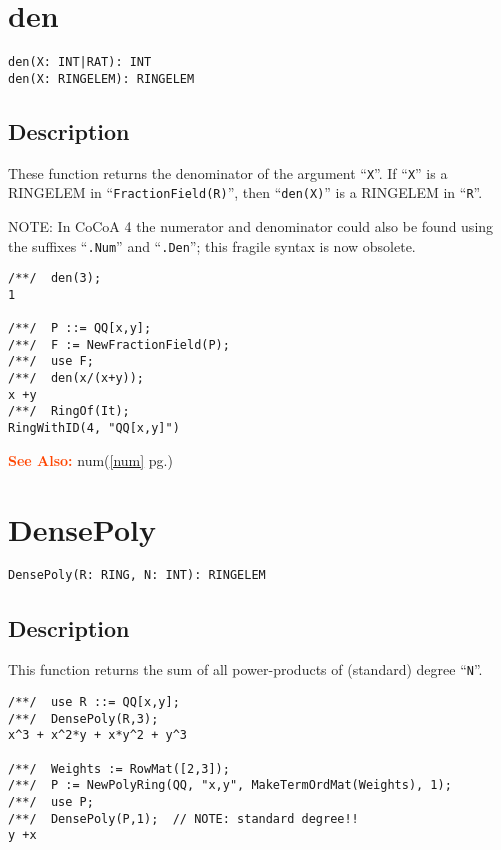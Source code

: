 \documentclass[a4paper]{mybook}
\newenvironment{command}{}{} %
\newcommand\SeeAlso{\par\textcolor{OrangeRed}{\textbf{\large See Also: }}}
\begin{document}
\section{den}
\label{den}
\begin{command} %


\begin{Verbatim}[label=syntax, rulecolor=\color{MidnightBlue},
frame=single]
den(X: INT|RAT): INT
den(X: RINGELEM): RINGELEM
\end{Verbatim}


\subsection*{Description}

These function returns the denominator of the argument ``\verb&X&''.
If ``\verb&X&'' is a RINGELEM in ``\verb&FractionField(R)&'',
then ``\verb&den(X)&'' is a RINGELEM in ``\verb&R&''.
\par 
NOTE: In CoCoA 4 the numerator and denominator could also be found
using the suffixes ``\verb&.Num&'' and ``\verb&.Den&''; this fragile syntax is
now obsolete.
\begin{Verbatim}[label=example, rulecolor=\color{PineGreen}, frame=single]
/**/  den(3);
1

/**/  P ::= QQ[x,y];
/**/  F := NewFractionField(P);
/**/  use F;
/**/  den(x/(x+y));
x +y
/**/  RingOf(It);
RingWithID(4, "QQ[x,y]")
\end{Verbatim}


\SeeAlso %
  num(\ref{num} pg.\pageref{num})
\end{command} %

\section{DensePoly}
\label{DensePoly}
\begin{command} %


\begin{Verbatim}[label=syntax, rulecolor=\color{MidnightBlue},
frame=single]
DensePoly(R: RING, N: INT): RINGELEM
\end{Verbatim}


\subsection*{Description}

This function returns the sum of all power-products of (standard) degree ``\verb&N&''.
\begin{Verbatim}[label=example, rulecolor=\color{PineGreen}, frame=single]
/**/  use R ::= QQ[x,y];
/**/  DensePoly(R,3);
x^3 + x^2*y + x*y^2 + y^3

/**/  Weights := RowMat([2,3]);
/**/  P := NewPolyRing(QQ, "x,y", MakeTermOrdMat(Weights), 1);
/**/  use P;
/**/  DensePoly(P,1);  // NOTE: standard degree!!
y +x
\end{Verbatim}


\end{command} %
\end{document}
